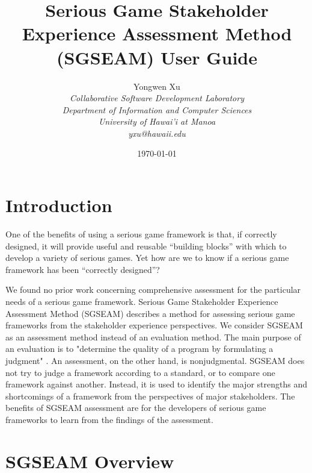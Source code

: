 \documentclass[11pt]{article}
\begin{document}
\title{Serious Game Stakeholder Experience Assessment Method (SGSEAM) User Guide}

\author{
	 Yongwen Xu \\
\em  Collaborative Software Development Laboratory \\
\em  Department of Information and Computer Sciences \\
\em  University of Hawai'i at Manoa\\
     yxu@hawaii.edu \\
}

\date{\today}
\maketitle

\tableofcontents

\graphicspath{{figures/}} 

\section{Introduction}
One of the benefits of using a serious game framework is that, if correctly designed, it will 
provide useful and reusable ``building blocks'' with which to develop a variety of serious 
games. Yet how are we to know if a serious game framework has been ``correctly designed''?

We found no prior work concerning comprehensive assessment for the particular needs of a serious game framework. Serious Game Stakeholder Experience Assessment Method (SGSEAM) describes a method for assessing serious game frameworks from the stakeholder experience perspectives. We consider SGSEAM as an assessment method instead of an evaluation method. The main purpose of an
evaluation is to "determine the quality of a program by formulating a judgment"
\cite{hurteau2009legitimate}. An assessment, on the other hand, is nonjudgmental. SGSEAM does
not try to judge a framework according to a standard, or to compare one framework against another. Instead, it is used to identify the major strengths and shortcomings of a framework from the perspectives of major stakeholders. The benefits of SGSEAM assessment are for the developers of serious game frameworks to learn from the findings of the assessment.

\section{SGSEAM Overview}
\end{document}
